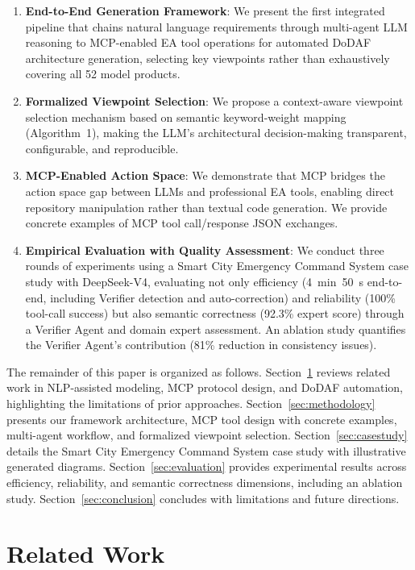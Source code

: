 \documentclass{ieeeaccess}
\begin{document}
\begin{enumerate}
    \item \textbf{End-to-End Generation Framework}: We present the first integrated pipeline that chains natural language requirements through multi-agent LLM reasoning to MCP-enabled EA tool operations for automated DoDAF architecture generation, selecting key viewpoints rather than exhaustively covering all 52 model products.
    \item \textbf{Formalized Viewpoint Selection}: We propose a context-aware viewpoint selection mechanism based on semantic keyword-weight mapping (Algorithm~1), making the LLM's architectural decision-making transparent, configurable, and reproducible.
    \item \textbf{MCP-Enabled Action Space}: We demonstrate that MCP bridges the action space gap between LLMs and professional EA tools, enabling direct repository manipulation rather than textual code generation. We provide concrete examples of MCP tool call/response JSON exchanges.
    \item \textbf{Empirical Evaluation with Quality Assessment}: We conduct three rounds of experiments using a Smart City Emergency Command System case study with DeepSeek-V4, evaluating not only efficiency (4~min~50~s end-to-end, including Verifier detection and auto-correction) and reliability (100\% tool-call success) but also semantic correctness (92.3\% expert score) through a Verifier Agent and domain expert assessment. An ablation study quantifies the Verifier Agent's contribution (81\% reduction in consistency issues).
\end{enumerate}

The remainder of this paper is organized as follows. Section~\ref{sec:related} reviews related work in NLP-assisted modeling, MCP protocol design, and DoDAF automation, highlighting the limitations of prior approaches. Section~\ref{sec:methodology} presents our framework architecture, MCP tool design with concrete examples, multi-agent workflow, and formalized viewpoint selection. Section~\ref{sec:casestudy} details the Smart City Emergency Command System case study with illustrative generated diagrams. Section~\ref{sec:evaluation} provides experimental results across efficiency, reliability, and semantic correctness dimensions, including an ablation study. Section~\ref{sec:conclusion} concludes with limitations and future directions.

\section{Related Work}
\label{sec:related}
\end{document}
